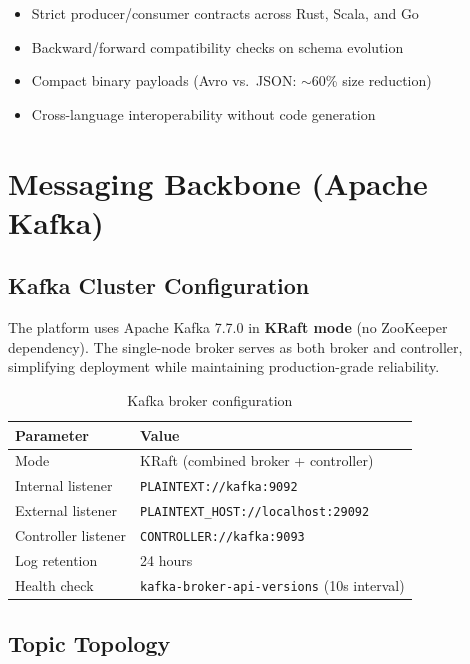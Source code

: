 \documentclass[12pt,a4paper]{article}
\begin{document}
\begin{itemize}
  \item Strict producer/consumer contracts across Rust, Scala, and Go
  \item Backward/forward compatibility checks on schema evolution
  \item Compact binary payloads (Avro vs.\ JSON: $\sim$60\% size reduction)
  \item Cross-language interoperability without code generation
\end{itemize}

\section{Messaging Backbone (Apache Kafka)}

\subsection{Kafka Cluster Configuration}

The platform uses Apache Kafka 7.7.0 in \textbf{KRaft mode} (no ZooKeeper dependency). The single-node broker serves as both broker and controller, simplifying deployment while maintaining production-grade reliability.

\begin{table}[H]
\centering
\caption{Kafka broker configuration}
\begin{tabular}{l l}
\toprule
\textbf{Parameter} & \textbf{Value} \\
\midrule
Mode & KRaft (combined broker + controller) \\
Internal listener & \texttt{PLAINTEXT://kafka:9092} \\
External listener & \texttt{PLAINTEXT\_HOST://localhost:29092} \\
Controller listener & \texttt{CONTROLLER://kafka:9093} \\
Log retention & 24 hours \\
Health check & \texttt{kafka-broker-api-versions} (10s interval) \\
\bottomrule
\end{tabular}
\end{table}

\subsection{Topic Topology}
\end{document}
